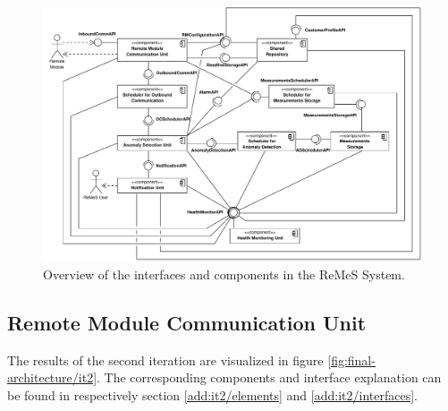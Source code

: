 \begin{figure}[H]
	\begin{centering}
		\includegraphics[height=\textwidth,angle=90]{figs/add-it1-interfaces.pdf}
		\caption{Overview of the interfaces and components in the ReMeS
		System.}
		\label{fig:final-architecture/it1}
	\end{centering}
\end{figure}

\subsection{Remote Module Communication Unit}

\npar The results of the second iteration are visualized in figure
\ref{fig:final-architecture/it2}. The corresponding components and interface
explanation can be found in respectively section \ref{add:it2/elements} and
\ref{add:it2/interfaces}.

